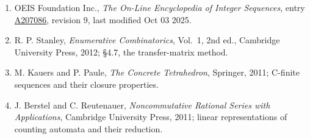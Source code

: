 \documentclass[11pt]{article}
\theoremstyle{definition}
\begin{document}
\begin{enumerate}

\item OEIS Foundation Inc., \emph{The On-Line Encyclopedia of Integer Sequences}, entry \href{https://oeis.org/A207086}{A207086}, revision 9, last modified Oct 03 2025.

\item R. P. Stanley, \emph{Enumerative Combinatorics}, Vol.~1, 2nd ed., Cambridge University Press, 2012; \S4.7, the transfer-matrix method.

\item M. Kauers and P. Paule, \emph{The Concrete Tetrahedron}, Springer, 2011; C-finite sequences and their closure properties.

\item J. Berstel and C. Reutenauer, \emph{Noncommutative Rational Series with Applications}, Cambridge University Press, 2011; linear representations of counting automata and their reduction.

\end{enumerate}
\end{document}
